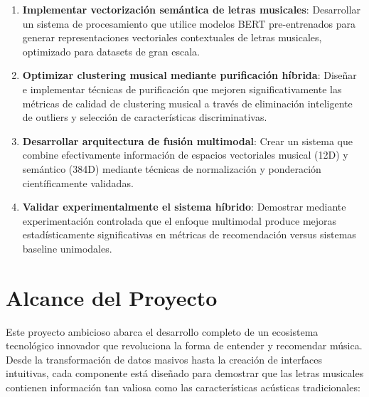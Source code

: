\documentclass[12pt,a4paper]{article}
\begin{document}
\begin{enumerate}
    \item \textbf{Implementar vectorización semántica de letras musicales}: Desarrollar un sistema de procesamiento que utilice modelos BERT pre-entrenados para generar representaciones vectoriales contextuales de letras musicales, optimizado para datasets de gran escala.
    
    \item \textbf{Optimizar clustering musical mediante purificación híbrida}: Diseñar e implementar técnicas de purificación que mejoren significativamente las métricas de calidad de clustering musical a través de eliminación inteligente de outliers y selección de características discriminativas.
    
    \item \textbf{Desarrollar arquitectura de fusión multimodal}: Crear un sistema que combine efectivamente información de espacios vectoriales musical (12D) y semántico (384D) mediante técnicas de normalización y ponderación científicamente validadas.
    
    \item \textbf{Validar experimentalmente el sistema híbrido}: Demostrar mediante experimentación controlada que el enfoque multimodal produce mejoras estadísticamente significativas en métricas de recomendación versus sistemas baseline unimodales.
    
\end{enumerate}

\section{Alcance del Proyecto}

Este proyecto ambicioso abarca el desarrollo completo de un ecosistema tecnológico innovador que revoluciona la forma de entender y recomendar música. Desde la transformación de datos masivos hasta la creación de interfaces intuitivas, cada componente está diseñado para demostrar que las letras musicales contienen información tan valiosa como las características acústicas tradicionales:
\end{document}
